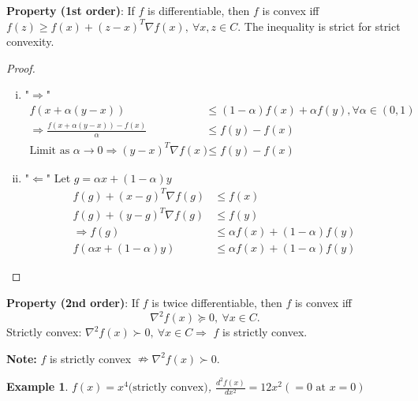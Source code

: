 \documentclass[11pt,a4paper]{article}
\newtheorem{example}{Example}
\begin{document}
\textbf{Property (1st order)}: If $f$ is differentiable, then $f$ is convex iff $f(z) \geq f(x)+(z-x)^{T} \nabla f(x), \ \forall x, z \in C .$ The inequality is strict for strict convexity.
\begin{proof}
\quad
\begin{enumerate}[(i)]
    \item "$\Rightarrow$" \begin{equation}
        \begin{aligned}
            f(x+\alpha (y-x))&\leq (1-\alpha)f(x)+\alpha f(y), \forall \alpha \in (0,1)\\
            \Rightarrow	\frac{f(x+\alpha(y-x))-f(x)}{\alpha}&\leq f(y)-f(x)\\
            \text{Limit as }\alpha \rightarrow 0 \Rightarrow (y-x)^{T} \nabla f(x)&\leq f(y)-f(x)
        \end{aligned}
        \nonumber
    \end{equation}
    \item "$\Leftarrow$" Let $g=\alpha x+(1-\alpha) y$
    \begin{equation}
        \begin{aligned}
            f(g)+(x-g)^{T} \nabla f(g)&\leq f(x)\\
            f(g)+(y-g)^{T} \nabla f(g)&\leq f(y)\\
            \Rightarrow	f(g)&\leq \alpha f(x)+(1-\alpha)f(y)\\
            f(\alpha x+(1-\alpha) y)&\leq \alpha f(x)+(1-\alpha)f(y)
        \end{aligned}
        \nonumber
    \end{equation}
\end{enumerate}
\end{proof}

\textbf{Property (2nd order)}: If $f$ is twice differentiable, then $f$ is convex iff
$$
\nabla^{2} f(x) \succeq 0,\ \forall x \in C .
$$
Strictly convex: $\nabla^{2} f(x) \succ 0,\ \forall x \in C \Rightarrow	$ $f$ is strictly convex.

\textbf{Note:} $f$ is strictly convex $\nRightarrow \nabla^{2} f(x) \succ 0$.
\begin{example}
$f(x)=x^4\text{(strictly convex)}$, $\frac{d^2f(x)}{dx^2}=12x^2(=0\text{ at }x=0)$
\end{example}
\end{document}
